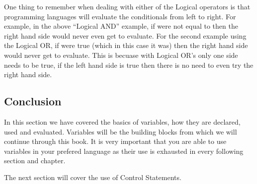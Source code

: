 One thing to remember when dealing with either of the Logical operators is that programming languages will evaluate the conditionals from left to right.
For example, in the above ``Logical AND'' example, if  were not equal to  then the right hand side  would never even get to evaluate.
For the second example using the Logical OR, if  were true (which in this case it was) then the right hand side would never get to evaluate.
This is becuase with Logical OR's only one side needs to be true, if the left hand side is true then there is no need to even try the right hand side.

\subsection{Conclusion}
In this section we have covered the basics of variables, how they are declared, used and evaluated.
Variables will be the building blocks from which we will continue through this book.
It is very important that you are able to use variables in your prefered language as their use is exhausted in every following section and chapter.
\par

The next section will cover the use of Control Statements.
